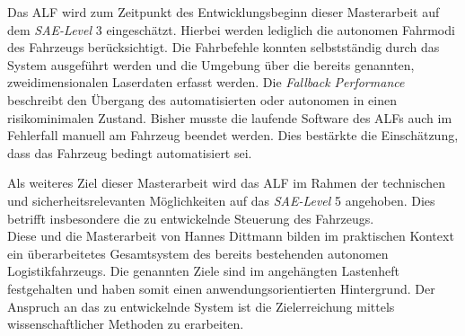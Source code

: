 		Das ALF wird zum Zeitpunkt des Entwicklungsbeginn dieser Masterarbeit auf dem \textit{SAE-Level} 3 eingeschätzt. Hierbei werden lediglich die autonomen Fahrmodi des Fahrzeugs berücksichtigt. Die Fahrbefehle konnten selbstständig durch das System ausgeführt werden und die Umgebung über die bereits genannten, zweidimensionalen Laserdaten erfasst werden. Die \textit{Fallback Performance} beschreibt den Übergang des automatisierten oder autonomen in einen risikominimalen Zustand. Bisher musste die laufende Software des ALFs auch im Fehlerfall manuell am Fahrzeug beendet werden. Dies bestärkte die Einschätzung, dass das Fahrzeug bedingt automatisiert sei.	
		
		
		
		Als weiteres Ziel dieser Masterarbeit wird das ALF im Rahmen der technischen und sicherheitsrelevanten Möglichkeiten auf das \textit{SAE-Level} 5 angehoben. Dies betrifft insbesondere die zu entwickelnde Steuerung des Fahrzeugs.\\
		
		Diese und die Masterarbeit von Hannes Dittmann bilden im praktischen Kontext ein überarbeitetes Gesamtsystem des bereits bestehenden autonomen Logistikfahrzeugs. Die genannten Ziele sind im angehängten Lastenheft festgehalten und haben somit einen anwendungsorientierten Hintergrund. Der Anspruch an das zu entwickelnde System ist die Zielerreichung mittels wissenschaftlicher Methoden zu erarbeiten.  
		
		
	